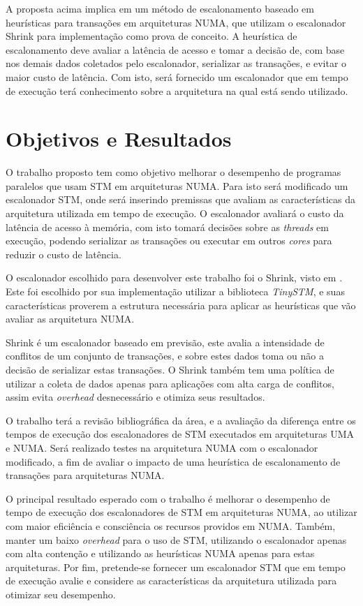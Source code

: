 \documentclass[diss-proposta,nocipinfo]{texufpel}
\begin{document}
A proposta acima implica em um método de escalonamento baseado em heurísticas para transações em arquiteturas NUMA, que utilizam o escalonador Shrink para implementação como prova de conceito. A heurística de escalonamento deve avaliar a latência de acesso e tomar a decisão de, com base nos demais dados coletados pelo escalonador, serializar as transações, e evitar o maior custo de latência. Com isto, será fornecido um escalonador que em tempo de execução terá conhecimento sobre a arquitetura na qual está sendo utilizado.

\chapter{Objetivos e Resultados}

O trabalho proposto tem como objetivo melhorar o desempenho de programas paralelos que usam STM em arquiteturas NUMA. Para isto será modificado um escalonador STM, onde será inserindo premissas que avaliam as características da arquitetura utilizada em tempo de execução. O escalonador avaliará o custo da latência de acesso à memória, com isto tomará decisões sobre as \emph{threads} em execução, podendo serializar as transações ou executar em outros \emph{cores} para reduzir o custo de latência.

O escalonador escolhido para desenvolver este trabalho foi o Shrink, visto em \cite{dragojevic09}. Este foi escolhido por sua implementação utilizar a biblioteca \emph{TinySTM}, e suas características proverem a estrutura necessária para aplicar as heurísticas que vão avaliar as arquitetura NUMA.

Shrink é um escalonador baseado em previsão, este avalia a intensidade de conflitos de um conjunto de transações, e sobre estes dados toma ou não a decisão de serializar estas transações. O Shrink também tem uma política de utilizar a coleta de dados apenas para aplicações com alta carga de conflitos, assim evita \emph{overhead} desnecessário e otimiza seus resultados.

O trabalho terá a revisão bibliográfica da área, e a avaliação da diferença entre os tempos de execução dos escalonadores de STM executados em arquiteturas UMA e NUMA. Será realizado testes na arquitetura NUMA com o escalonador modificado, a fim de avaliar o impacto de uma heurística de escalonamento de transações para arquiteturas NUMA.

O principal resultado esperado com o trabalho é melhorar o desempenho de tempo de execução dos escalonadores de STM em arquiteturas NUMA, ao utilizar com maior eficiência e consciência os recursos providos em NUMA. Também, manter um baixo \emph{overhead} para o uso de STM, utilizando o escalonador apenas com alta contenção e utilizando as heurísticas NUMA apenas para estas arquiteturas. Por fim, pretende-se fornecer um escalonador STM que em tempo de execução avalie e considere as características da arquitetura utilizada para otimizar seu desempenho.
\end{document}
